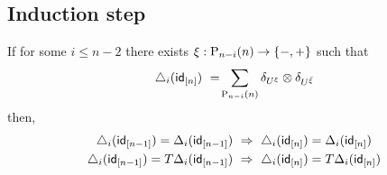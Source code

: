 \subsection{Induction step}

\begin{lemma}
     If for some $i \leq n - 2$ there exists $\xi : \P_{n-i}(n) \to \{-, +\}$ such that
     \[
     \triangle_i(\id_{[n]})\ =\! \sum_{\P_{n-i}(n)} \delta_{U^{\xi}} \otimes \delta_{U^{{\bar{\xi}}}}
     \]
     then,
     \begin{align*}
     \triangle_i(\id_{[n-1]}) = \Delta_i(\id_{[n-1]})
     \ & \Rightarrow \
     \triangle_i(\id_{[n]}) = \Delta_i(\id_{[n]}) \\
     \triangle_i(\id_{[n-1]}) = T \Delta_i(\id_{[n-1]})
     \ & \Rightarrow \
     \triangle_i(\id_{[n]}) = T \Delta_i(\id_{[n]})
     \end{align*}
\end{lemma}

